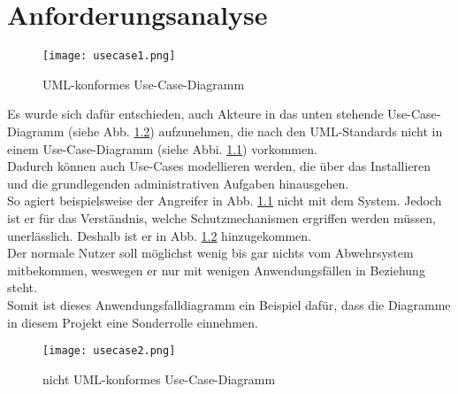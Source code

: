 \documentclass[../review_1.tex]{subfiles}
\begin{document}
\chapter{Anforderungsanalyse}\thispagestyle{fancy} %
\vspace{-1.5cm}
\begin{figure}[h]
    \centering
    \texttt{[image: usecase1.png]}
    \caption{UML-konformes Use-Case-Diagramm}
    \label{usecase1}
\end{figure}
\noindent  Es wurde sich dafür entschieden, auch Akteure in das unten stehende Use-Case-Diagramm (siehe Abb. \ref{usecase2}) aufzunehmen, die nach den UML-Standards nicht in einem Use-Case-Diagramm (siehe Abbi. \ref{usecase1}) vorkommen.\\
Dadurch können auch Use-Cases modellieren werden, die über das Installieren und die grundlegenden administrativen Aufgaben hinausgehen.\\
So agiert beispielsweise der Angreifer in Abb. \ref{usecase1} nicht mit dem System. Jedoch ist er für das Verständnis, welche Schutzmechanismen ergriffen werden müssen, unerlässlich. Deshalb ist er in Abb. \ref{usecase2} hinzugekommen.\\
Der normale Nutzer soll möglichst wenig bis gar nichts vom Abwehrsystem mitbekommen, weswegen er nur mit wenigen Anwendungsfällen in Beziehung steht. \\
Somit ist dieses Anwendungsfalldiagramm  ein Beispiel dafür, dass die Diagramme in diesem Projekt eine Sonderrolle einnehmen.
\begin{figure}[ht]
    \centering
    \texttt{[image: usecase2.png]}
    \caption{nicht UML-konformes Use-Case-Diagramm}
    \label{usecase2}
\end{figure}
\end{document}
